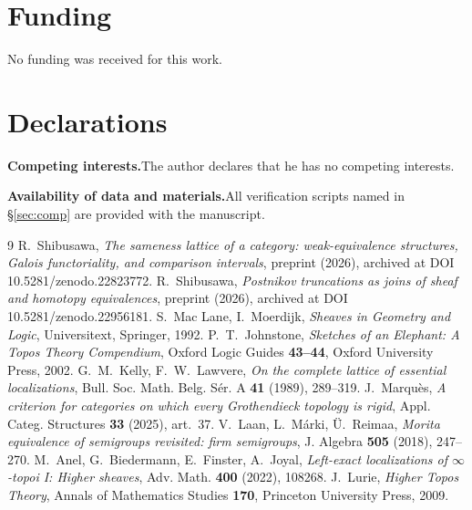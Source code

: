 \documentclass[11pt]{amsart}
\theoremstyle{definition}
\begin{document}
\section*{Funding}
No funding was received for this work.

\section*{Declarations}
\noindent\textbf{Competing interests.}\quad The author declares that he has no
competing interests.

\noindent\textbf{Availability of data and materials.}\quad All verification
scripts named in \S\ref{sec:comp} are provided with the manuscript.

\begin{thebibliography}{9}
 R.~Shibusawa, \emph{The sameness lattice of a category:
weak-equivalence structures, Galois functoriality, and comparison intervals},
preprint (2026), archived at DOI 10.5281/zenodo.22823772.
 R.~Shibusawa, \emph{Postnikov truncations as joins of sheaf
and homotopy equivalences}, preprint (2026), archived at DOI 10.5281/zenodo.22956181.
 S.~Mac Lane, I.~Moerdijk, \emph{Sheaves in Geometry and Logic},
Universitext, Springer, 1992.
 P.~T.~Johnstone, \emph{Sketches of an Elephant: A Topos
Theory Compendium}, Oxford Logic Guides \textbf{43--44}, Oxford University
Press, 2002.
 G.~M.~Kelly, F.~W.~Lawvere, \emph{On the complete lattice of
essential localizations}, Bull. Soc. Math. Belg. S\'er. A \textbf{41} (1989),
289--319.
 J.~Marqu\`es, \emph{A criterion for categories on which
every Grothendieck topology is rigid}, Appl. Categ. Structures \textbf{33}
(2025), art.\ 37.
 V.~Laan, L.~M\'arki, \"U.~Reimaa, \emph{Morita equivalence of
semigroups revisited: firm semigroups}, J. Algebra \textbf{505} (2018), 247--270.
 M.~Anel, G.~Biedermann, E.~Finster, A.~Joyal, \emph{Left-exact
localizations of $\infty$-topoi I: Higher sheaves}, Adv. Math. \textbf{400}
(2022), 108268.
 J.~Lurie, \emph{Higher Topos Theory}, Annals of Mathematics
Studies \textbf{170}, Princeton University Press, 2009.
\end{thebibliography}
\end{document}
